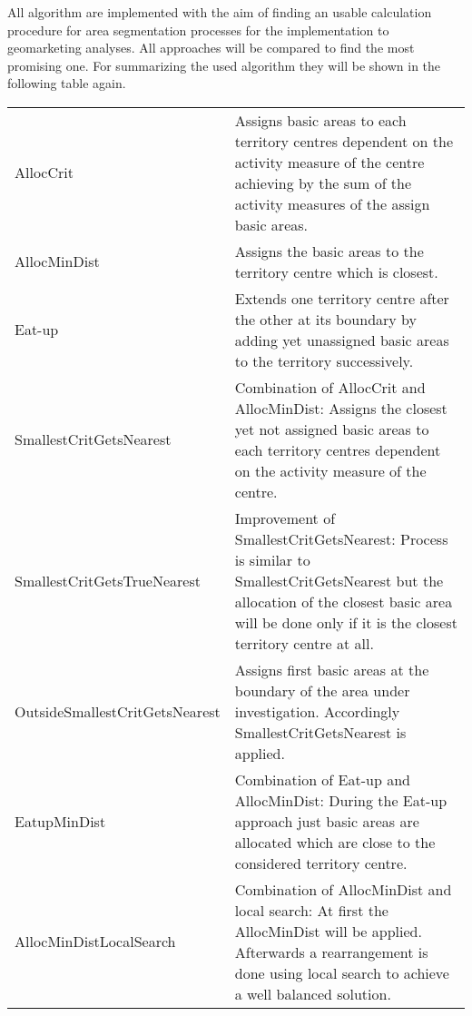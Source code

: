 All algorithm are implemented with the aim of finding an usable calculation procedure for area segmentation processes for the implementation to geomarketing analyses. All approaches will be compared to find the most promising one. For summarizing the used algorithm they will be shown in the following table again.

\newpage


\begin{table}[H]
	\begin{tabular}{|p{5.5cm}|>{\RaggedRight}p{7.5cm}|}
		\hline
		& \centering{Short explanation} \tabularnewline
		\hline
		AllocCrit & Assigns basic areas to each territory centres dependent on the activity measure of the centre achieving by the sum of the activity measures of the assign basic areas.
		\tabularnewline
		\hline
		AllocMinDist & Assigns the basic areas to the territory centre which is closest.
		\tabularnewline
		\hline
		Eat-up & Extends one territory centre after the other at its boundary by adding yet unassigned basic areas to the territory successively.
		\tabularnewline
		\hline
		SmallestCritGetsNearest & Combination of AllocCrit and AllocMinDist: Assigns the closest yet not assigned basic areas to each territory centres dependent on the activity measure of the centre.
		\tabularnewline
		\hline
		SmallestCritGetsTrueNearest & Improvement of SmallestCritGetsNearest: Process is similar to SmallestCritGetsNearest but the allocation of the closest basic area will be done only if it is the closest territory centre at all.
		\tabularnewline
		\hline
		OutsideSmallestCritGetsNearest & Assigns first basic areas at the boundary of the area under investigation. Accordingly SmallestCritGetsNearest is applied.
		\tabularnewline
		\hline
		EatupMinDist & Combination of Eat-up and AllocMinDist: During the Eat-up approach just basic areas are allocated which are close to the considered territory centre.
		\tabularnewline
		\hline
		AllocMinDistLocalSearch & Combination of AllocMinDist and local search: At first the AllocMinDist will be applied. Afterwards a rearrangement is done using local search to achieve a well balanced solution.
		\tabularnewline
		\hline
	\end{tabular}
\end{table}

\newpage

